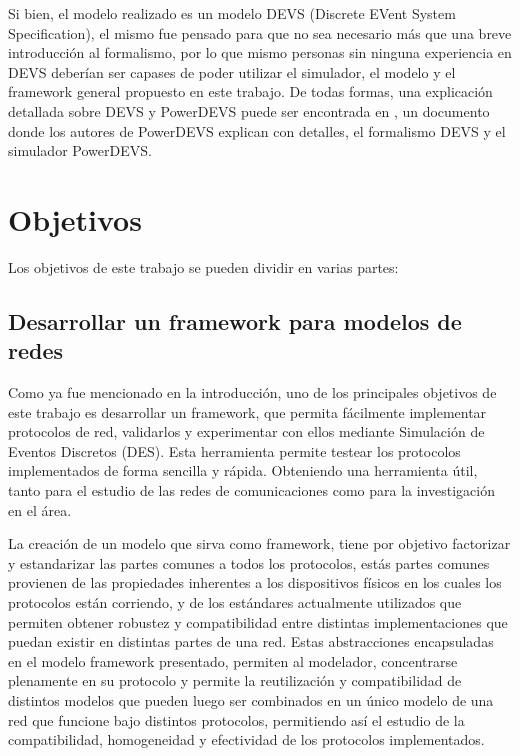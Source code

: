 \documentclass[10pt,a4paper]{article}
\begin{document}
Si bien, el modelo realizado es un modelo DEVS (Discrete EVent System Specification), el mismo fue pensado para que no sea necesario más que una breve introducción al formalismo, por lo que mismo personas sin ninguna experiencia en DEVS deberían ser capases de poder utilizar el simulador, el modelo y el framework general propuesto en este trabajo. De todas formas, una explicación detallada sobre DEVS y PowerDEVS puede ser encontrada en \cite{bergero2011powerdevs}, un documento donde los autores de PowerDEVS explican con detalles, el formalismo DEVS y el simulador PowerDEVS. \\

\section{Objetivos}

Los objetivos de este trabajo se pueden dividir en varias partes:
\subsection{Desarrollar un framework para modelos de redes}

Como ya fue mencionado en la introducción, uno de los principales objetivos de este trabajo es desarrollar un framework, que permita fácilmente implementar protocolos de red, validarlos y experimentar con ellos mediante Simulación de Eventos Discretos (DES). Esta herramienta permite testear los protocolos implementados de forma sencilla y rápida. Obteniendo una herramienta útil, tanto para el estudio de las redes de comunicaciones como para la investigación en el área. 

La creación de un modelo que sirva como framework, tiene por objetivo factorizar y estandarizar las partes comunes a todos los protocolos, estás partes comunes provienen de las propiedades inherentes a los dispositivos físicos en los cuales los protocolos están corriendo, y de los estándares actualmente utilizados que permiten obtener robustez y compatibilidad entre distintas implementaciones que puedan existir en distintas partes de una red. Estas abstracciones encapsuladas en el modelo framework presentado, permiten al modelador, concentrarse plenamente en su protocolo y permite la reutilización y compatibilidad de distintos modelos que pueden luego ser combinados en un único modelo de una red que funcione bajo distintos protocolos, permitiendo así el estudio de la compatibilidad, homogeneidad y efectividad de los protocolos implementados.
\end{document}

